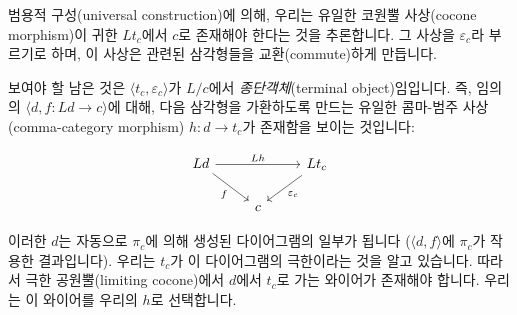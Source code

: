 \documentclass[DaoFP]{subfiles}
\begin{document}
범용적 구성(universal construction)에 의해, 우리는 유일한 코원뿔 사상(cocone morphism)이 귀한 $L t_c$에서 $c$로 존재해야 한다는 것을 추론합니다. 그 사상을 $\varepsilon_c$라 부르기로 하며, 이 사상은 관련된 삼각형들을 교환(commute)하게 만듭니다.

보여야 할 남은 것은 $\langle t_c, \varepsilon_c \rangle$가 $L/c$에서 \emph{종단객체}(terminal object)임입니다. 즉, 임의의 $\langle d, f \colon L d \to c \rangle$에 대해, 다음 삼각형을 가환하도록 만드는 유일한 콤마-범주 사상(comma-category morphism) $h \colon d \to t_c$가 존재함을 보이는 것입니다:

\[
 \begin{tikzcd}
 L d
 \arrow[rd, "f"']
 \arrow[rr, "L h"]
 && L t_c
 \arrow[ld, "\varepsilon_c"]
 \\
 &c
  \end{tikzcd}
\]

이러한 $d$는 자동으로 $\pi_c$에 의해 생성된 다이어그램의 일부가 됩니다 ($\langle d, f \rangle$에 $\pi_c$가 작용한 결과입니다). 우리는 $t_c$가 이 다이어그램의 극한이라는 것을 알고 있습니다. 따라서 극한 공원뿔(limiting cocone)에서 $d$에서 $t_c$로 가는 와이어가 존재해야 합니다. 우리는 이 와이어를 우리의 $h$로 선택합니다.
\end{document}
